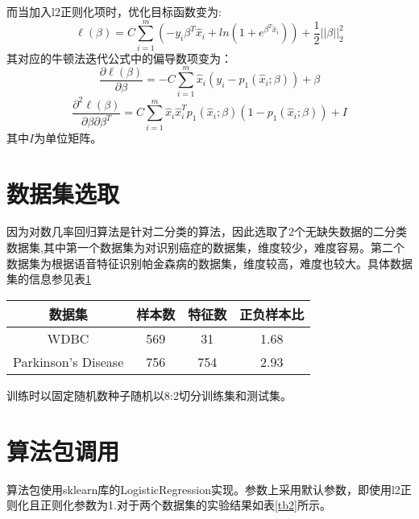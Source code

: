 \documentclass{SCIS2020cn}
\begin{document}
而当加入l2正则化项时，优化目标函数变为:
\begin{equation}
    \ell(\beta)=C\sum_{i=1}^m(-y_i\beta^T\hat x_i+ln\left(1+e^{\beta^T\hat x_i}\right))+\frac{1}{2}||\beta||_2^2
\end{equation}
其对应的牛顿法迭代公式中的偏导数项变为：
\begin{equation}
    \label{eq11}
    \frac{\partial\ell(\beta)}{\partial\beta}=-C\sum_{i=1}^m\hat x_i(y_i-p_1(\hat x_i;\beta))+\beta
\end{equation}
\begin{equation}
    \label{eq12}
    \frac{\partial^2\ell(\beta)}{\partial\beta\partial\beta^T}=C\sum_{i=1}^m\hat x_i\hat x_i^Tp_1(\hat x_i;\beta)(1-p_1(\hat x_i;\beta))+I
\end{equation}
其中$I$为单位矩阵。

\section{数据集选取 }
因为对数几率回归算法是针对二分类的算法，因此选取了2个无缺失数据的二分类数据集,其中第一个数据集为对识别癌症的数据集，维度较少，难度容易。第二个数据集为根据语音特征识别帕金森病的数据集，维度较高，难度也较大。具体数据集的信息参见表\ref{tb1}

\begin{table}[!t]
    \label{tb1}
    \begin{center}
        \begin{tabular}{@{}cccc@{}}
            \toprule
            数据集                 & 样本数 & 特征数 & 正负样本比 \\ \midrule
            WDBC                & 569 & 31  & 1.68  \\
            Parkinson's Disease & 756 & 754 & 2.93  \\ \bottomrule
        \end{tabular}
    \end{center}
\end{table}

训练时以固定随机数种子随机以8:2切分训练集和测试集。

\section{算法包调用 }

算法包使用sklearn库的LogisticRegression实现。参数上采用默认参数，即使用l2正则化且正则化参数为1.对于两个数据集的实验结果如表\ref{tb2}所示。
\end{document}
